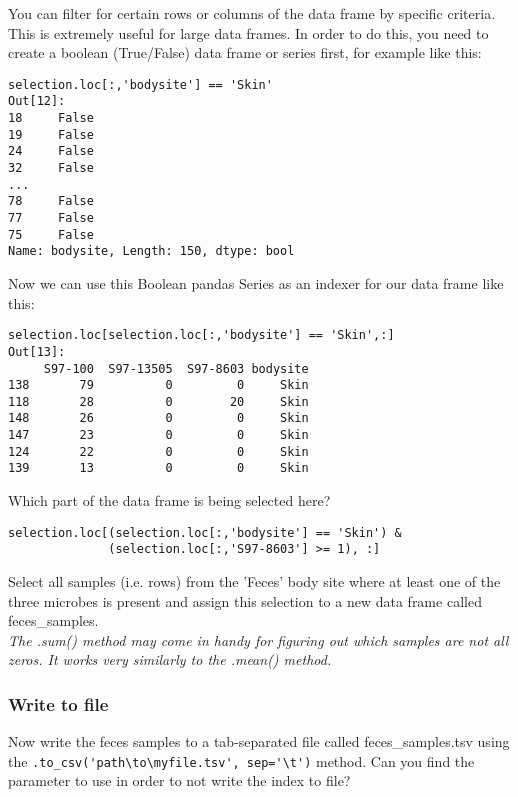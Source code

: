 \documentclass[12pt]{article}
\begin{document}
You can filter for certain rows or columns of the data frame by specific criteria. This is extremely useful for large data frames. 
In order to do this, you need to create a boolean (True/False) data frame or series first, for example like this:
\begin{verbatim}
selection.loc[:,'bodysite'] == 'Skin'
Out[12]: 
18     False
19     False
24     False
32     False
...
78     False
77     False
75     False
Name: bodysite, Length: 150, dtype: bool

\end{verbatim}
Now we can use this Boolean pandas Series as an indexer for our data frame like this:
\begin{verbatim}
selection.loc[selection.loc[:,'bodysite'] == 'Skin',:]
Out[13]: 
     S97-100  S97-13505  S97-8603 bodysite
138       79          0         0     Skin
118       28          0        20     Skin
148       26          0         0     Skin
147       23          0         0     Skin
124       22          0         0     Skin
139       13          0         0     Skin

\end{verbatim}
Which part of the data frame is being selected here?
\begin{verbatim}
selection.loc[(selection.loc[:,'bodysite'] == 'Skin') & 
			  (selection.loc[:,'S97-8603'] >= 1), :]
\end{verbatim}
Select all samples (i.e. rows) from the 'Feces' body site where at least one of the three microbes is present and assign this selection to a new data frame called feces\_samples.\\

\textit{The .sum() method may come in handy for figuring out which samples are not all zeros. It works very similarly to the .mean() method.}

\subsubsection{Write to file}
Now write the feces samples to a tab-separated file called feces\_samples.tsv using the \verb|.to_csv('path\to\myfile.tsv', sep='\t')| method. Can you find the parameter to use in order to not write the index to file?
\end{document}

